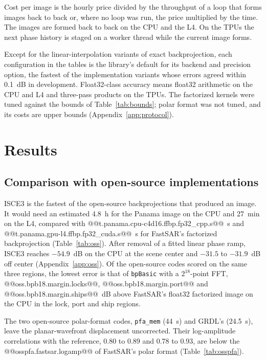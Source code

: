 \documentclass[11pt]{article}
\begin{document}
Cost per image is the hourly price divided by the throughput of a loop that forms images back to back or, where no loop was run, the price multiplied by the time. The images are formed back to back on the CPU and the L4. On the TPUs the next phase history is staged on a worker thread while the current image forms.

Except for the linear-interpolation variants of exact backprojection, each configuration in the tables is the library's default for its backend and precision option, the fastest of the implementation variants whose errors agreed within 0.1~dB in development. Float32-class accuracy means float32 arithmetic on the CPU and L4 and three-pass products on the TPUs. The factorized kernels were tuned against the bounds of Table~\ref{tab:bounds}; polar format was not tuned, and its costs are upper bounds (Appendix~\ref{app:protocol}).

\section{Results}
\label{sec:results}

\subsection{Comparison with open-source implementations}
\label{sec:oss}

ISCE3 is the fastest of the open-source backprojections that produced an image. It would need an estimated 4.8~h for the Panama image on the CPU and 27~min on the L4, compared with @@t.panama.cpu-c4d16.ffbp.fp32_cpp.s@@~s and @@t.panama.gpu-l4.ffbp.fp32_cuda.s@@~s for FastSAR's factorized backprojection (Table~\ref{tab:oss}). After removal of a fitted linear phase ramp, ISCE3 reaches $-54.9$~dB on the CPU at the scene center and $-31.5$ to $-31.9$~dB off center (Appendix~\ref{app:oss}). Of the open-source codes scored on the same three regions, the lowest error is that of \texttt{bpBasic} with a $2^{18}$-point FFT, @@oss.bpb18.margin.locks@@, @@oss.bpb18.margin.port@@ and @@oss.bpb18.margin.ships@@~dB above FastSAR's float32 factorized image on the CPU in the lock, port and ship regions.

The two open-source polar-format codes, \texttt{pfa\_mem} (44~s) and GRDL's (24.5~s), leave the planar-wavefront displacement uncorrected. Their log-amplitude correlations with the reference, 0.80 to 0.89 and 0.78 to 0.93, are below the @@osspfa.fastsar.logamp@@ of FastSAR's polar format (Table~\ref{tab:osspfa}).
\end{document}
